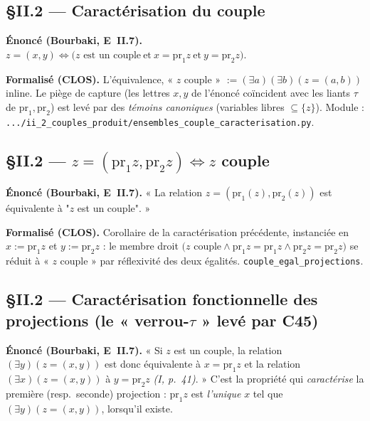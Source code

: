 
\subsection{§II.2 --- Caractérisation du couple}
\textbf{Énoncé (Bourbaki, E~II.7).} $z=(x,y)\Leftrightarrow\bigl(z\text{ est un couple}
\ \text{et}\ x=\mathrm{pr}_1 z\ \text{et}\ y=\mathrm{pr}_2 z\bigr)$.

\textbf{Formalisé (CLOS).} L'équivalence, « $z$ couple » $:=(\exists a)(\exists b)(z=(a,b))$
inline. Le piège de capture (les lettres $x,y$ de l'énoncé coïncident avec les liants
$\tau$ de $\mathrm{pr}_1,\mathrm{pr}_2$) est levé par des \emph{témoins canoniques}
(variables libres $\subseteq\{z\}$). Module : \texttt{.../ii\_2\_couples\_produit/ensembles\_couple\_caracterisation.py}.

\subsection{§II.2 --- $z=(\mathrm{pr}_1 z,\mathrm{pr}_2 z)\Leftrightarrow z$ couple}
\textbf{Énoncé (Bourbaki, E~II.7).} « La relation $z=(\mathrm{pr}_1(z),\mathrm{pr}_2(z))$
est équivalente à "$z$ est un couple". »

\textbf{Formalisé (CLOS).} Corollaire de la caractérisation précédente, instanciée en
$x:=\mathrm{pr}_1 z$ et $y:=\mathrm{pr}_2 z$ : le membre droit $\bigl(z\text{ couple}\wedge
\mathrm{pr}_1 z=\mathrm{pr}_1 z\wedge\mathrm{pr}_2 z=\mathrm{pr}_2 z\bigr)$ se réduit à
« $z$ couple » par réflexivité des deux égalités. \texttt{couple\_egal\_projections}.

\subsection{§II.2 --- Caractérisation fonctionnelle des projections (le « verrou-$\tau$ » levé par C45)}
\textbf{Énoncé (Bourbaki, E~II.7).} « Si $z$ est un couple, la relation
$(\exists y)(z=(x,y))$ est donc équivalente à $x=\mathrm{pr}_1 z$ et la relation
$(\exists x)(z=(x,y))$ à $y=\mathrm{pr}_2 z$ \emph{(I, p.~41)}. » C'est la propriété qui
\emph{caractérise} la première (resp.\ seconde) projection : $\mathrm{pr}_1 z$ est
\emph{l'unique} $x$ tel que $(\exists y)(z=(x,y))$, lorsqu'il existe.

